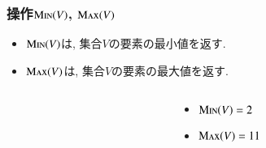 \documentclass[main]{subfiles}
\begin{document}
\begin{frame}\frametitle{操作$\mathrm{\text{M\textsc{in}}}(V)$, $\mathrm{\text{M\textsc{ax}}}(V)$}
\begin{itemize}
	\item $\mathrm{\text{M\textsc{in}}}(V)$は, 集合$V$の要素の最小値を返す.\\
	\item $\mathrm{\text{M\textsc{ax}}}(V)$は, 集合$V$の要素の最大値を返す.\\
\end{itemize}

\begin{columns}[c]
	\begin{column}{0.5\linewidth}
		
	\end{column}
	\begin{column}{0.49\linewidth}
		\begin{itemize}
			\item $\mathrm{\text{M\textsc{in}}}(V) = 2$\\
			\item $\mathrm{\text{M\textsc{ax}}}(V) = 11$\\
		\end{itemize}
	\end{column}
\end{columns}
\end{frame}
\end{document}
